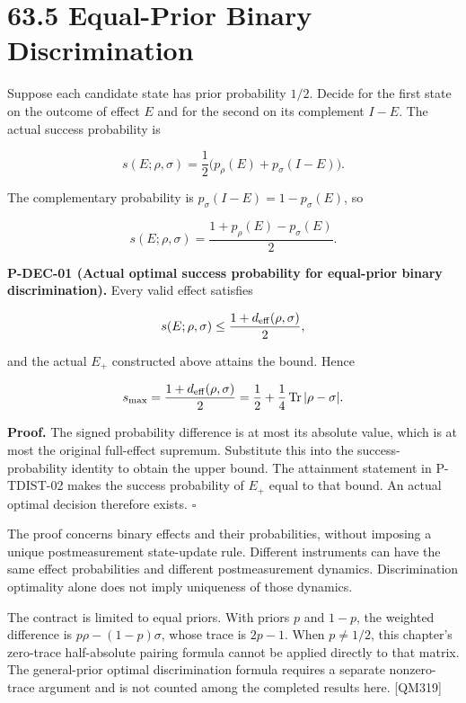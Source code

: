 \documentclass[
  11pt,
  oneside]{book}
\begin{document}
\section{63.5 Equal-Prior Binary Discrimination}

Suppose each candidate state has prior probability \(1/2\). Decide for
the first state on the outcome of effect \(E\) and for the second on its
complement \(I-E\). The actual success probability is

\[
s(E;\rho,\sigma)
=\frac12\bigl(p_\rho(E)+p_\sigma(I-E)\bigr).
\]

The complementary probability is \(p_\sigma(I-E)=1-p_\sigma(E)\), so

\[
s(E;\rho,\sigma)
=\frac{1+p_\rho(E)-p_\sigma(E)}2.
\]

\label{p-dec-01}{}

\textbf{P-DEC-01 (Actual optimal success probability for equal-prior
binary discrimination).} Every valid effect satisfies

\[
s(E;\rho,\sigma)\le\frac{1+d_{\rm eff}(\rho,\sigma)}2,
\]

and the actual \(E_+\) constructed above attains the bound. Hence

\[
s_{\max}
=\frac{1+d_{\rm eff}(\rho,\sigma)}2
=\frac12+\frac14\operatorname{Tr}|\rho-\sigma|.
\]

\textbf{Proof.} The signed probability difference is at most its
absolute value, which is at most the original full-effect supremum.
Substitute this into the success-probability identity to obtain the
upper bound. The attainment statement in P-TDIST-02 makes the success
probability of \(E_+\) equal to that bound. An actual optimal decision
therefore exists. \(\square\)

The proof concerns binary effects and their probabilities, without
imposing a unique postmeasurement state-update rule. Different
instruments can have the same effect probabilities and different
postmeasurement dynamics. Discrimination optimality alone does not imply
uniqueness of those dynamics.

The contract is limited to equal priors. With priors \(p\) and \(1-p\),
the weighted difference is \(p\rho-(1-p)\sigma\), whose trace is
\(2p-1\). When \(p\ne1/2\), this chapter's zero-trace half-absolute
pairing formula cannot be applied directly to that matrix. The
general-prior optimal discrimination formula requires a separate
nonzero-trace argument and is not counted among the completed results
here. {[}QM319{]}
\end{document}
